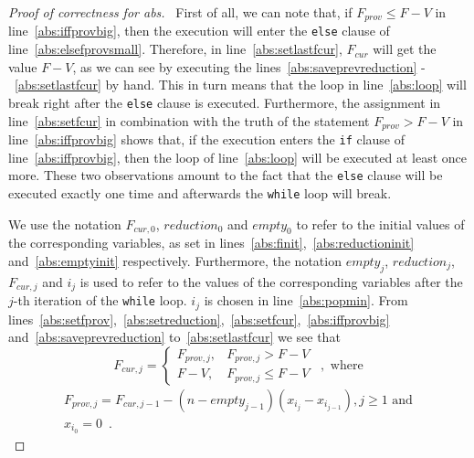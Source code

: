 \begin{proof}[Proof of correctness for abs] \
  First of all, we can note that, if $F_{prov} \leq F - V$ in line~\ref{abs:iffprovbig}, then the execution will enter the
  \texttt{else} clause of line~\ref{abs:elsefprovsmall}. Therefore, in line~\ref{abs:setlastfcur}, $F_{cur}$ will get the
  value $F - V$, as we can see by executing the lines~\ref{abs:saveprevreduction} -~\ref{abs:setlastfcur} by hand. This in
  turn means that the loop in line~\ref{abs:loop} will break right after the \texttt{else} clause is executed. Furthermore,
  the assignment in line~\ref{abs:setfcur} in combination with the truth of the statement $F_{prov} > F - V$ in
  line~\ref{abs:iffprovbig} shows that, if the execution enters the \texttt{if} clause of line~\ref{abs:iffprovbig}, then
  the loop of line~\ref{abs:loop} will be executed at least once more. These two observations amount to the fact that the
  \texttt{else} clause will be executed exactly one time and afterwards the \texttt{while} loop will break.

  We use the notation $F_{cur, 0}$, $reduction_0$ and $empty_0$ to refer to the initial values of the corresponding
  variables, as set in lines~\ref{abs:finit},~\ref{abs:reductioninit} and~\ref{abs:emptyinit} respectively. Furthermore, the
  notation $empty_j$, $reduction_j$, $F_{cur, j}$ and $i_j$ is used to refer to the values of the corresponding variables
  after the $j$-th iteration of the \texttt{while} loop. $i_j$ is chosen in line~\ref{abs:popmin}. From
  lines~\ref{abs:setfprov},~\ref{abs:setreduction},~\ref{abs:setfcur},~\ref{abs:iffprovbig} and~\ref{abs:saveprevreduction}
  to~\ref{abs:setlastfcur} we see that
  \begin{equation*}
    F_{cur, j} =
    \begin{cases}
       F_{prov, j},& F_{prov, j} > F - V \\
       F - V ,& F_{prov, j} \leq F - V
    \end{cases} \enspace, \mbox{ where}
  \end{equation*}
  \begin{equation*}
  \begin{gathered}
    F_{prov, j} = F_{cur, j-1} - \left(n - empty_{j-1}\right)\left(x_{i_j} - x_{i_{j-1}}\right), j \geq 1 \mbox{ and} \\
    x_{i_0} = 0 \enspace.
  \end{gathered}
  \end{equation*}


\end{proof}

